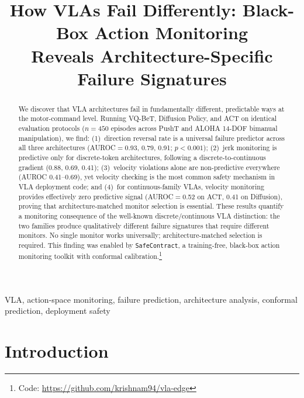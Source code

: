 \documentclass[conference]{IEEEtran}
\begin{document}
\title{How VLAs Fail Differently: Black-Box Action Monitoring\\Reveals Architecture-Specific Failure Signatures}

\author{
}

\maketitle

\begin{abstract}
We discover that VLA architectures fail in fundamentally different, predictable ways at the motor-command level.
Running VQ-BeT, Diffusion Policy, and ACT on identical evaluation protocols ($n{=}450$ episodes across PushT and ALOHA 14-DOF bimanual manipulation), we find:
(1)~direction reversal rate is a universal failure predictor across all three architectures (AUROC${=}$0.93, 0.79, 0.91; $p < 0.001$);
(2)~jerk monitoring is predictive only for discrete-token architectures, following a discrete-to-continuous gradient (0.88, 0.69, 0.41);
(3)~velocity violations alone are non-predictive everywhere (AUROC 0.41--0.69), yet velocity checking is the most common safety mechanism in VLA deployment code;
and (4)~for continuous-family VLAs, velocity monitoring provides effectively zero predictive signal (AUROC${=}$0.52 on ACT, 0.41 on Diffusion), proving that architecture-matched monitor selection is essential.
These results quantify a monitoring consequence of the well-known discrete/continuous VLA distinction: the two families produce qualitatively different failure signatures that require different monitors.
No single monitor works universally; architecture-matched selection is required.
This finding was enabled by \texttt{SafeContract}, a training-free, black-box action monitoring toolkit with conformal calibration.\footnote{Code: \url{https://github.com/krishnam94/vla-edge}}
\end{abstract}

\begin{IEEEkeywords}
VLA, action-space monitoring, failure prediction, architecture analysis, conformal prediction, deployment safety
\end{IEEEkeywords}

\section{Introduction}
\end{document}
